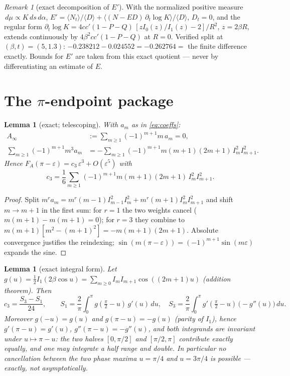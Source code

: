 \documentclass[11pt]{article}
\newtheorem{lemma}[theorem]{Lemma}
\theoremstyle{remark}
\newtheorem{remark}[theorem]{Remark}
\newcommand{\FA}{F_{\!A}}
\newcommand{\dd}{\,d}
\begin{document}
\begin{remark}[exact decomposition of $E'$]\label{rem:Eprime}
With the normalized positive measure $\dd\mu\propto K\dd s\dd\alpha$,
$E'=\langle N_t\rangle/\langle D\rangle+\langle(N-ED)\,
\partial_t\log K\rangle/\langle D\rangle$, $D_t=0$, and the regular form
$\partial_t\log K=4cc'(1-P-Q)\,[zI_0(z)/I_1(z)-2]/R^2$, $z=2\beta R$,
extends continuously by $4\beta^2cc'(1-P-Q)$ at $R=0$. Verified split at
$(\beta,t)=(5,1.3)$: $-0.238212-0.024552=-0.262764=$ the finite
difference exactly. Bounds for $E'$ are taken from this exact quotient
--- never by differentiating an estimate of $E$.
\end{remark}

\section{The $\pi$-endpoint package}\label{sec:endpoint}

\begin{lemma}[exact; telescoping]\label{lem:telescope}
With $a_m$ as in \eqref{eq:coeffs}:
\[
\begin{aligned}
A_\infty&:=\sum_{m\ge1}(-1)^{m+1}m\,a_m=0,\\
\sum_{m\ge1}(-1)^{m+1}m^3a_m
&=-\sum_{m\ge1}(-1)^{m+1}m(m+1)(2m+1)\,I_m^2I_{m+1}^2 .
\end{aligned}
\]
Hence $\FA(\pi-\varepsilon)=c_3\,\varepsilon^3+O(\varepsilon^5)$ with
\begin{equation}\label{eq:c3}
c_3=\frac16\sum_{m\ge1}(-1)^{m+1}m(m+1)(2m+1)\,I_m^2I_{m+1}^2 .
\end{equation}
\end{lemma}

\begin{proof}
Split $m^ra_m=m^r(m-1)I_{m-1}^2I_m^2+m^r(m+1)I_m^2I_{m+1}^2$ and shift
$m\to m+1$ in the first sum: for $r=1$ the two weights cancel
($m(m+1)-m(m+1)=0$); for $r=3$ they combine to
$m(m+1)[m^2-(m+1)^2]=-m(m+1)(2m+1)$. Absolute convergence justifies the
reindexing; $\sin(m(\pi-\varepsilon))=(-1)^{m+1}\sin(m\varepsilon)$
expands the sine.
\end{proof}

\begin{lemma}[exact integral form]\label{lem:c3int}
Let $g(u)=\tfrac12 I_1(2\beta\cos u)=\sum_{m\ge0}I_mI_{m+1}
\cos((2m+1)u)$ \textup{(addition theorem)}. Then
\[
c_3=\frac{S_3-S_1}{24},\qquad
S_1=\frac{2}{\pi}\int_0^{\pi}g(\tfrac\pi2-u)\,g'(u)\dd u,\quad
S_3=\frac{2}{\pi}\int_0^{\pi}g'(\tfrac\pi2-u)\,\bigl(-g''(u)\bigr)\dd u .
\]
Moreover $g(-u)=g(u)$ and $g(\pi-u)=-g(u)$ (parity of $I_1$), hence
$g'(\pi-u)=g'(u)$, $g''(\pi-u)=-g''(u)$, and \emph{both} integrands are
invariant under $u\mapsto\pi-u$: the two halves $[0,\pi/2]$ and
$[\pi/2,\pi]$ contribute exactly equally, and one may integrate a half
range and double. In particular no cancellation between the two phase
maxima $u=\pi/4$ and $u=3\pi/4$ is possible --- exactly, not
asymptotically.
\end{lemma}
\end{document}
